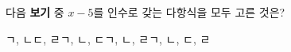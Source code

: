 다음 \textbf{보기} 중 $x-5$를 인수로 갖는 다항식을 모두 고른 것은?
\begin{choices32}{ㄱ, ㄴ}{ㄷ, ㄹ}{ㄱ, ㄴ, ㄷ}{ㄱ, ㄴ, ㄹ}{ㄱ, ㄴ, ㄷ, ㄹ}\end{choices32}
